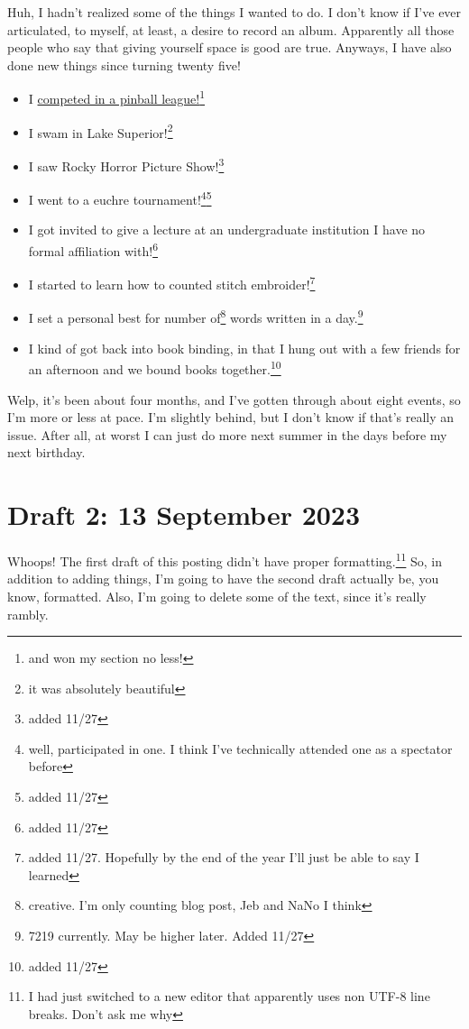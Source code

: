 \documentclass[12pt]{article}[titlepage]
\newcommand{\1}{\={a}}
\newcommand{\2}{\={e}}
\newcommand{\3}{\={\i}}
\newcommand{\4}{\=o}
\newcommand{\5}{\=u}
\newcommand{\6}{\={A}}
\renewcommand{\,}{\textsuperscript{,}}
\begin{document}
Huh, I hadn't realized some of the things I wanted to do.
I don't know if I've ever articulated, to myself, at least, a desire to record an album.
Apparently all those people who say that giving yourself space is good are true.
Anyways, I have also done new things since turning twenty five!
\begin{itemize}
\item I \href{pinball.html}{competed in a pinball league!}\footnote{and won my section no less!}
\item I swam in Lake Superior!\footnote{it was absolutely beautiful}
\item I saw Rocky Horror Picture Show!\footnote{added 11/27}
\item I went to a euchre tournament!\footnote{well, participated in one. I think I've technically attended one as a spectator before}\footnote{added 11/27}
\item I got invited to give a lecture at an undergraduate institution I have no formal affiliation with!\footnote{added 11/27}
\item I started to learn how to counted stitch embroider!\footnote{added 11/27. Hopefully by the end of the year I'll just be able to say I learned}
\item I set a personal best for number of\footnote{creative. I'm only counting blog post, Jeb and NaNo I think} words written in a day.\footnote{7219 currently. May be higher later. Added 11/27}
\item I kind of got back into book binding, in that I hung out with a few friends for an afternoon and we bound books together.\footnote{added 11/27}
\end{itemize}
Welp, it's been about four months, and I've gotten through about eight events, so I'm more or less at pace.
I'm slightly behind, but I don't know if that's really an issue.
After all, at worst I can just do more next summer in the days before my next birthday.


\section{Draft 2: 13 September 2023}
Whoops!
The first draft of this posting didn't have proper formatting.\footnote{I had just switched to a new editor that apparently uses non UTF-8 line breaks.  
Don't ask me why}
So, in addition to adding things, I'm going to have the second draft actually be, you know, formatted. 
Also, I'm going to delete some of the text, since it's really rambly. 
 
\end{document}
